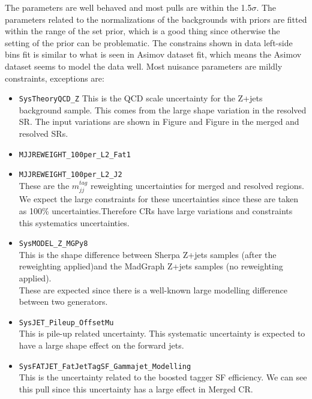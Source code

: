 The parameters are well behaved and most pulls are within the 1.5$\sigma$.
The parameters related to the normalizations of the backgrounds with priors are fitted within the range of the set prior, which is a good thing since otherwise the setting of the prior can be problematic.
The constrains shown in data left-side bins fit is similar to what is seen in Asimov dataset fit, which means the Asimov dataset seems to model the data well.
Most nuisance parameters are mildly constraints, exceptions are:
\begin{itemize}
       \item \texttt{SysTheoryQCD\_Z} 
        This is the QCD scale uncertainty for the Z+jets background sample. This comes from the large shape variation in the resolved SR. The input variations are shown in Figure and Figure in the merged and resolved SRs. \\
       \item \texttt{MJJREWEIGHT\_100per\_L2\_Fat1} 
       \item \texttt{MJJREWEIGHT\_100per\_L2\_J2} \\
       These are the $m^{tag}_{jj}$ reweighting uncertainties for merged and resolved regions. We expect the large constraints for these uncertainties since these are taken as 100\% uncertainties.Therefore CRs have large variations and constraints this systematics uncertainties. \\
       \item \texttt{SysMODEL\_Z\_MGPy8} \\
       This is the shape difference between Sherpa Z+jets samples (after the \mjjtag reweighting applied)and the MadGraph Z+jets samples (no \mjjtag reweighting applied). \\
       These are expected since there is a well-known large modelling difference between two generators. \\
       \item \texttt{SysJET\_Pileup\_OffsetMu} \\
       This is pile-up related uncertainty.
       This systematic uncertainty is expected to have a large shape effect on the forward jets.
       \\
       \item \texttt{SysFATJET\_FatJetTagSF\_Gammajet\_Modelling} \\
       This is the uncertainty related to the boosted tagger SF efficiency.
       We can see this pull since this uncertainty has a large effect in Merged CR. 
\end{itemize}

